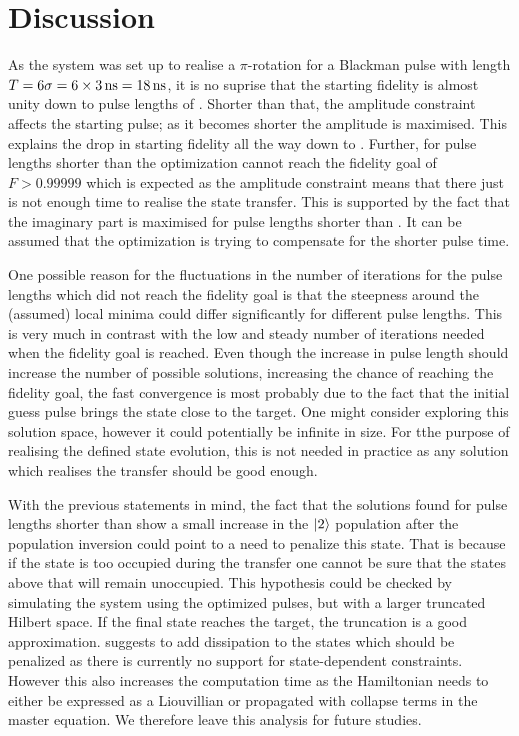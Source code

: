 \documentclass[main.tex]{subfiles}
\begin{document}
\section{Discussion}
As the system was set up to realise a \(\pi\)-rotation for a Blackman pulse with length \(T=6\sigma = 6\times\SI{3}{\nano\second} = \SI{18}{\nano\second}\), it is no suprise that the starting fidelity is almost unity down to pulse lengths of .
Shorter than that, the amplitude constraint affects the starting pulse; as it becomes shorter the amplitude is maximised.
This explains the drop in starting fidelity all the way down to .
Further, for pulse lengths shorter than  the optimization cannot reach the fidelity goal of \(F > 0.99999\) which is expected as the amplitude constraint means that there just is not enough time to realise the state transfer.
This is supported by the fact that the imaginary part is maximised for pulse lengths shorter than .
It can be assumed that the optimization is trying to compensate for the shorter pulse time.

One possible reason for the fluctuations in the number of iterations for the pulse lengths which did not reach the fidelity goal is that the steepness around the (assumed) local minima could differ significantly for different pulse lengths.
This is very much in contrast with the low and steady number of iterations needed when the fidelity goal is reached.
Even though the increase in pulse length should increase the number of possible solutions, increasing the chance of reaching the fidelity goal, the fast convergence is most probably due to the fact that the initial guess pulse brings the state close to the target.
One might consider exploring this solution space, however it could potentially be infinite in size.
For tthe purpose of realising the defined state evolution, this is not needed in practice as any solution which realises the transfer should be good enough.

With the previous statements in mind, the fact that the solutions found for pulse lengths shorter than  show a small increase in the \(\ket{2}\) population after the population inversion could point to a need to penalize this state.
That is because if the state is too occupied during the transfer one cannot be sure that the states above that will remain unoccupied.
This hypothesis could be checked by simulating the system using the optimized pulses, but with a larger truncated Hilbert space.
If the final state reaches the target, the truncation is a good approximation.
\krotov{} suggests to add dissipation to the states which should be penalized as there is currently no support for state-dependent constraints.
However this also increases the computation time as the Hamiltonian needs to either be expressed as a Liouvillian or propagated with collapse terms in the master equation.
We therefore leave this analysis for future studies.
\end{document}
